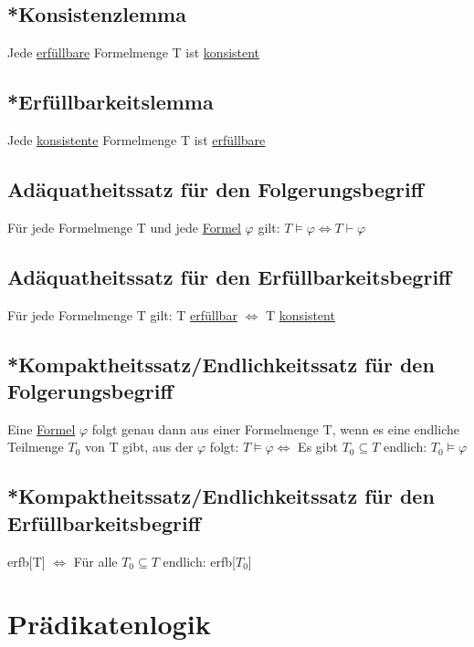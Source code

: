 \documentclass[12pt,a4paper]{article} %
\begin{document}
	\subsection{*Konsistenzlemma}
	Jede \hyperref[Erfullbar]{erfüllbare} Formelmenge T ist \hyperref[ALKonsistent]{konsistent}
	
	\subsection{*Erfüllbarkeitslemma}
	Jede \hyperref[ALKonsistent]{konsistente} Formelmenge T ist \hyperref[Erfullbar]{erfüllbare}
	
	\subsection{Adäquatheitssatz für den Folgerungsbegriff}
	Für jede Formelmenge T und jede \hyperref[Formel]{Formel} $\varphi$ gilt: $T \hyperref[Erfullbar]{\vDash} \varphi \Leftrightarrow T \hyperref[Beweisbar]{\vdash} \varphi$
	
	\subsection{Adäquatheitssatz für den Erfüllbarkeitsbegriff}
	Für jede Formelmenge T gilt: T \hyperref[Erfullbar]{erfüllbar} $\Leftrightarrow$ T \hyperref[ALKonsistent]{konsistent} 
	
	\subsection{*Kompaktheitssatz/Endlichkeitssatz für den Folgerungsbegriff}
	Eine \hyperref[Formel]{Formel} $\varphi$ folgt genau dann aus einer Formelmenge T, wenn es eine endliche Teilmenge $T_0$ von T gibt, aus der $\varphi$ folgt: $T \hyperref[Erfullbar]{\vDash} \varphi \Leftrightarrow$ Es gibt $T_0 \subseteq T$ endlich: $T_0 \hyperref[Erfullbar]{\vDash} \varphi$
	
	\subsection{*Kompaktheitssatz/Endlichkeitssatz für den Erfüllbarkeitsbegriff}
	erfb[T] $\Leftrightarrow$ Für alle $T_0 \subseteq T$ endlich: erfb[$T_0$]
	
	\newpage
	\section{Prädikatenlogik}
\end{document}
